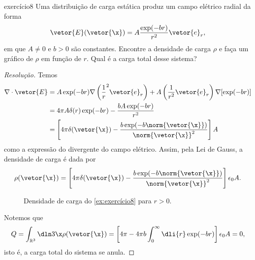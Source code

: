 \begin{exercício}{}{exercício8}
    Uma distribuição de carga estática produz um campo elétrico radial da forma
    \begin{equation*}
        \vetor{E}(\vetor{\x}) = A\frac{\exp(-br)}{r^2}\vetor{e}_r,
    \end{equation*}
    em que \(A \neq 0\) e \(b > 0\) são constantes. Encontre a densidade de carga \(\rho\) e faça um gráfico de \(\rho\) em função de \(r\). Qual é a carga total desse sistema?
\end{exercício}
\begin{proof}[Resolução]
    Temos
    \begin{align*}
        \nabla \cdot \vetor{E} &= A \exp(-br)\nabla\left(\frac1r^2\vetor{e}_r\right) + A \left(\frac{1}{r^2}\vetor{e}_r\right)\nabla[\exp(-br)]\\
        &= 4\pi A \delta(r) \exp(-br) - \frac{bA\exp(-br)}{r^2}\\
        &= \left[4\pi \delta(\vetor{\x}) - \frac{b \exp(-b\norm{\vetor{\x}})}{\norm{\vetor{\x}}^2}\right]A
    \end{align*}
    como a expressão do divergente do campo elétrico. Assim, pela Lei de Gauss, a densidade de carga é dada por
    \begin{equation*}
        \rho(\vetor{\x}) = \left[4\pi \delta(\vetor{\x}) - \frac{b \exp(-b\norm{\vetor{\x}})}{\norm{\vetor{\x}}^2}\right]\epsilon_0 A.
    \end{equation*}

    \begin{figure}[!h]
        \centering
        \caption{Densidade de carga do \cref{ex:exercício8} para \(r > 0\).}
    \end{figure}

    Notemos que
    \begin{align*}
        Q = \int_{\mathbb{R}^3} \dln3\x \rho(\vetor{\x}) = \left[4\pi - 4\pi b \int_{0}^\infty \dli{r} \exp(-br)\right]\epsilon_0 A = 0,
    \end{align*}
    isto é, a carga total do sistema se anula.
\end{proof}
